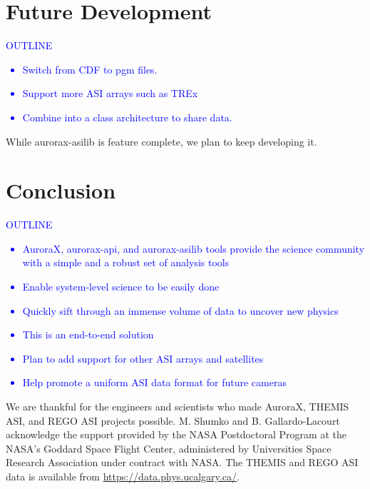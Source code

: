 \documentclass[draft]{agujournal2019}
\begin{document}
\section{Future Development}
\textcolor{blue}{
      OUTLINE
      \begin{itemize}
            \item Switch from CDF to pgm files.
            \item Support more ASI arrays such as TREx
            \item Combine into a class architecture to share data.
      \end{itemize}
}
While aurorax-asilib is feature complete, we plan to keep developing it.

\section{Conclusion}

\textcolor{blue}{
      OUTLINE
      \begin{itemize}
            \item AuroraX, aurorax-api, and aurorax-asilib tools provide the science community with a simple and a robust set of analysis tools
            \item Enable system-level science to be easily done
            \item Quickly sift through an immense volume of data to uncover new physics
            \item This is an end-to-end solution
            \item Plan to add support for other ASI arrays and satellites
            \item Help promote a uniform ASI data format for future cameras
      \end{itemize}
}

\acknowledgments
We are thankful for the engineers and scientists who made AuroraX, THEMIS ASI, and REGO ASI projects possible. M. Shumko and B. Gallardo-Lacourt acknowledge the support provided by the NASA Postdoctoral Program at the NASA’s Goddard Space Flight Center, administered by Universities Space Research Association under contract with NASA. The THEMIS and REGO ASI data is available from \url{https://data.phys.ucalgary.ca/}.

% 
\end{document}
